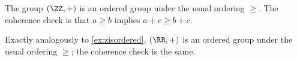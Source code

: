 \documentclass[../notes.tex]{subfiles}
\begin{document}
\begin{example} \label{ex:zisordered}
	The group $(\ZZ,+)$ is an ordered group under the usual ordering $\ge$. The coherence check is that $a\ge b$ implies $a+c\ge b+c$.
\end{example}
\begin{example}
	Exactly analogously to \autoref{ex:zisordered}, $(\RR,+)$ is an ordered group under the usual ordering $\ge$; the coherence check is the same.
\end{example}
	


			
\end{document}
